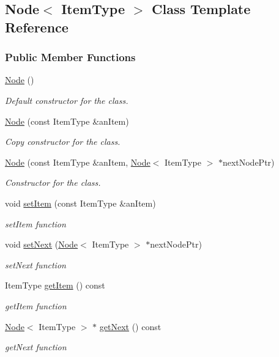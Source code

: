 \hypertarget{class_node}{}\subsection{Node$<$ Item\+Type $>$ Class Template Reference}
\label{class_node}
\subsubsection*{Public Member Functions}
\begin{DoxyCompactItemize}
\item 
\hyperlink{class_node_a627e94f4fba0e73c546e0fb2a7266f36}{Node} ()
\begin{DoxyCompactList}\small\item\em Default constructor for the class. \end{DoxyCompactList}\item 
\hyperlink{class_node_a0288598fcb0244739ce95099c26250ae}{Node} (const Item\+Type \&an\+Item)
\begin{DoxyCompactList}\small\item\em Copy constructor for the class. \end{DoxyCompactList}\item 
\hypertarget{class_node_adf98d3f9b7227622cb5a0fdd7e8f0b18}{}\label{class_node_adf98d3f9b7227622cb5a0fdd7e8f0b18} 
\hyperlink{class_node_adf98d3f9b7227622cb5a0fdd7e8f0b18}{Node} (const Item\+Type \&an\+Item, \hyperlink{class_node}{Node}$<$ Item\+Type $>$ $\ast$next\+Node\+Ptr)
\begin{DoxyCompactList}\small\item\em Constructor for the class. \end{DoxyCompactList}\item 
void \hyperlink{class_node_ab4ceecdecc5df799011de486b9f54974}{set\+Item} (const Item\+Type \&an\+Item)
\begin{DoxyCompactList}\small\item\em set\+Item function \end{DoxyCompactList}\item 
void \hyperlink{class_node_a01c1a66d4e39f5b149e090413deb4633}{set\+Next} (\hyperlink{class_node}{Node}$<$ Item\+Type $>$ $\ast$next\+Node\+Ptr)
\begin{DoxyCompactList}\small\item\em set\+Next function \end{DoxyCompactList}\item 
Item\+Type \hyperlink{class_node_a6c08caef312b6f2f69b5e090cf047514}{get\+Item} () const
\begin{DoxyCompactList}\small\item\em get\+Item function \end{DoxyCompactList}\item 
\hyperlink{class_node}{Node}$<$ Item\+Type $>$ $\ast$ \hyperlink{class_node_a3eb0c96e03a3fd46ea1cff4c305bbedd}{get\+Next} () const
\begin{DoxyCompactList}\small\item\em get\+Next function \end{DoxyCompactList}\end{DoxyCompactItemize}
